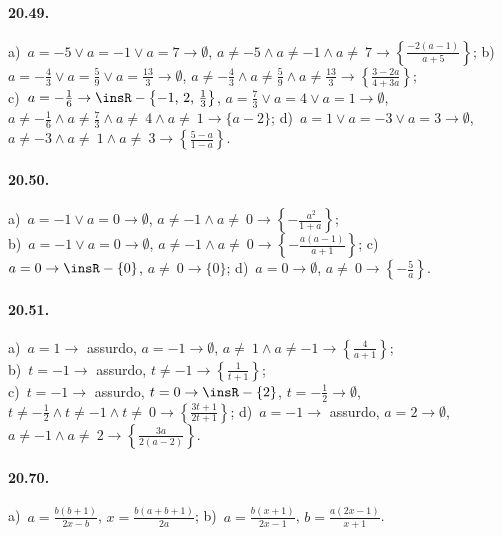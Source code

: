 \paragraph{20.49.}
a)~$a=-5\vee a=-1\vee a=7 \rightarrow \emptyset$, $a\neq -5\wedge a\neq -1\wedge a\neq~7 \rightarrow \left\{\frac{-2(a-1)}{a+5}\right\}$;
\quad b)~$a=-{\frac{4}{3}}\vee a=\frac{5}{9}\vee a=\frac{13}{3} \rightarrow \emptyset$, $a\neq -{\frac{4}{3}}\wedge a\neq \frac{5}{9}\wedge a\neq \frac{13}{3} \rightarrow \left\{\frac{3-2a}{4+3a}\right\}$;
\protect\\ c)~$a=-{\frac{1}{6}} \rightarrow \insR-\left\{-1\text{,~}2\text{,~}\frac{1}{3}\right\}$, $a=\frac{7}{3}\vee a=4\vee a=1 \rightarrow \emptyset$, $a\neq -{\frac{1}{6}}\wedge a\neq \frac{7}{3}\wedge a\neq~4\wedge a\neq~1 \rightarrow \{a-2\}$;
\quad d)~$a=1\vee a=-3\vee a=3 \rightarrow \emptyset$, $a\neq -3\wedge a\neq~1\wedge a\neq~3 \rightarrow \left\{\frac{5-a}{1-a}\right\}$.

\paragraph{20.50.}
a)~$a=-1\vee a=0 \rightarrow \emptyset$, $a\neq -1\wedge a\neq~0 \rightarrow \left\{-{\frac{\ a^{2}}{1+a}}\right\}$;
\protect\\ b)~$a=-1\vee a=0 \rightarrow \emptyset$, $a\neq -1\wedge a\neq~0 \rightarrow \left\{-{\frac{a(a-1)}{a+1}}\right\}$;
\quad c)~$a=0 \rightarrow \insR-\{0\}$, $a\neq~0 \rightarrow \{0\}$;
\quad d)~$a=0 \rightarrow \emptyset$, $a\neq~0 \rightarrow \left\{-{\frac{5}{a}}\right\}$.

\paragraph{20.51.}
a)~$a=1 \rightarrow$ assurdo, $a=-1 \rightarrow \emptyset$, $a\neq~1\wedge a\neq -1 \rightarrow \left\{\frac{4}{a+1}\right\}$;
\protect\\ b)~$t=-1 \rightarrow$ assurdo, $t\neq -1 \rightarrow \left\{\frac{1}{t+1}\right\}$;
\protect\\ c)~$t=-1 \rightarrow$ assurdo, $t=0 \rightarrow \insR-\{2\}$, $t=-{\frac{1}{2}} \rightarrow \emptyset$, $t\neq -\frac{1}{2}\wedge t\neq -1\wedge t\neq~0 \rightarrow \left\{\frac{3t+1}{2t+1}\right\}$;
\quad d)~$a=-1 \rightarrow$ assurdo, $a=2 \rightarrow \emptyset$, $a\neq -1\wedge a\neq~2 \rightarrow \left\{\frac{3a}{2(a-2)}\right\}$.

\paragraph{20.70.}
a)~$a=\frac{b(b+1)}{2x-b}$, $x=\frac{b(a+b+1)}{2a}$;
\quad b)~$a=\frac{b(x+1)}{2x-1}$, $b=\frac{a(2x-1)}{x+1}$.
